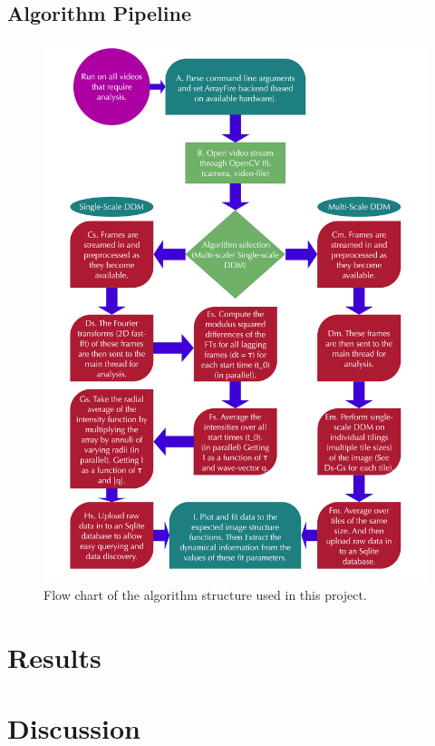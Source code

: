 \documentclass[11pt]{article}
\begin{document}
\subsection{Algorithm Pipeline}
\begin{figure}[H]
\centering
\noindent \includegraphics[height=0.7\paperwidth, width=0.6\paperwidth]{images/algo-pipeline.png}
\caption{Flow chart of the algorithm structure used in this project.}
\end{figure}
 
\clearpage
\section{Results}

\clearpage
\section{Discussion}
\end{document}
